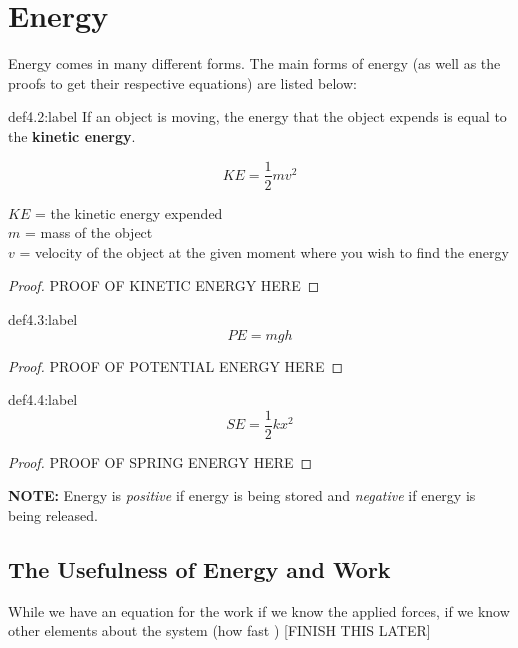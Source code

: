 \section{Energy}

Energy comes in many different forms. The main forms of energy (as well as the proofs to get their respective equations) are listed below:


\begin{definition}{def4.2:label}
    If an object is moving, the energy that the object expends is equal to the \textbf{kinetic energy}. 

    $$
    KE = \frac{1}{2}mv^2
    $$

    $KE$ = the kinetic energy expended\\
    $m$ = mass of the object\\
    $v$ = velocity of the object at the given moment where you wish to find the energy
\end{definition}

\begin{proof}
    PROOF OF KINETIC ENERGY HERE
\end{proof}


\begin{definition}{def4.3:label}
    $$
    PE = mgh
    $$
\end{definition}

\begin{proof}
    PROOF OF POTENTIAL ENERGY HERE
\end{proof}

\begin{definition}{def4.4:label}
    $$
    SE = \frac{1}{2}kx^2
    $$
\end{definition}

\begin{proof}
    PROOF OF SPRING ENERGY HERE
\end{proof}

\textbf{NOTE:} Energy is \textit{positive} if energy is being stored and \textit{negative} if energy is being released.

\subsection{The Usefulness of Energy and Work}

While we have an equation for the work if we know the applied forces, if we know other elements about the system (how fast ) [FINISH THIS LATER]


